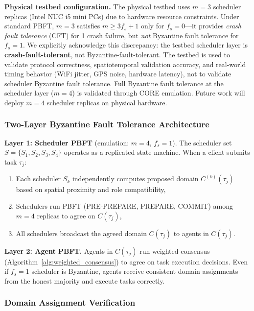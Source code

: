 \documentclass[manuscript,screen,review]{acmart}
\begin{document}
\textbf{Physical testbed configuration.} The physical testbed uses $m = 3$ scheduler replicas (Intel NUC i5 mini PCs) due to hardware resource constraints. Under standard PBFT, $m = 3$ satisfies $m \geq 3f_s + 1$ only for $f_s = 0$---it provides \textit{crash fault tolerance} (CFT) for 1 crash failure, but \textit{not} Byzantine fault tolerance for $f_s = 1$. We explicitly acknowledge this discrepancy: the testbed scheduler layer is \textbf{crash-fault-tolerant}, not Byzantine-fault-tolerant. The testbed is used to validate protocol correctness, spatiotemporal validation accuracy, and real-world timing behavior (WiFi jitter, GPS noise, hardware latency), not to validate scheduler Byzantine fault tolerance. Full Byzantine fault tolerance at the scheduler layer ($m = 4$) is validated through CORE emulation. Future work will deploy $m = 4$ scheduler replicas on physical hardware.

\subsubsection{Two-Layer Byzantine Fault Tolerance Architecture}
\label{sec:two_layer_bft}

\textbf{Layer 1: Scheduler PBFT} (emulation: $m = 4$, $f_s = 1$). The scheduler set $S = \{S_1, S_2, S_3, S_4\}$ operates as a replicated state machine. When a client submits task $\tau_j$:
\begin{enumerate}
\item Each scheduler $S_k$ independently computes proposed domain $C^{(k)}(\tau_j)$ based on spatial proximity and role compatibility,
\item Schedulers run PBFT (PRE-PREPARE, PREPARE, COMMIT) among $m=4$ replicas to agree on $C(\tau_j)$,
\item All schedulers broadcast the agreed domain $C(\tau_j)$ to agents in $C(\tau_j)$.
\end{enumerate}

\textbf{Layer 2: Agent PBFT.} Agents in $C(\tau_j)$ run weighted consensus (Algorithm~\ref{alg:weighted_consensus}) to agree on task execution decisions. Even if $f_s = 1$ scheduler is Byzantine, agents receive consistent domain assignments from the honest majority and execute tasks correctly.

\subsubsection{Domain Assignment Verification}
\label{sec:domain_verification}
\end{document}
